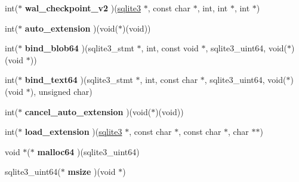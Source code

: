 \begin{DoxyCompactItemize}
\item 
int($\ast$ {\bfseries wal\+\_\+checkpoint\+\_\+v2} )(\hyperlink{structsqlite3}{sqlite3} $\ast$, const char $\ast$, int, int $\ast$, int $\ast$)\hypertarget{structsqlite3__api__routines_aff09d36bf959eb60923935f855b7f7b4}{}\label{structsqlite3__api__routines_aff09d36bf959eb60923935f855b7f7b4}

\item 
int($\ast$ {\bfseries auto\+\_\+extension} )(void($\ast$)(void))\hypertarget{structsqlite3__api__routines_afd7c008f165176aeeea8d6e4e0bfabc0}{}\label{structsqlite3__api__routines_afd7c008f165176aeeea8d6e4e0bfabc0}

\item 
int($\ast$ {\bfseries bind\+\_\+blob64} )(sqlite3\+\_\+stmt $\ast$, int, const void $\ast$, sqlite3\+\_\+uint64, void($\ast$)(void $\ast$))\hypertarget{structsqlite3__api__routines_af7cf21f7a1465dd0c4d6947762998aa2}{}\label{structsqlite3__api__routines_af7cf21f7a1465dd0c4d6947762998aa2}

\item 
int($\ast$ {\bfseries bind\+\_\+text64} )(sqlite3\+\_\+stmt $\ast$, int, const char $\ast$, sqlite3\+\_\+uint64, void($\ast$)(void $\ast$), unsigned char)\hypertarget{structsqlite3__api__routines_aafda4305000f885aabf0fe18bd86b905}{}\label{structsqlite3__api__routines_aafda4305000f885aabf0fe18bd86b905}

\item 
int($\ast$ {\bfseries cancel\+\_\+auto\+\_\+extension} )(void($\ast$)(void))\hypertarget{structsqlite3__api__routines_a33a813156c2973e7b41f4e1d01ec93da}{}\label{structsqlite3__api__routines_a33a813156c2973e7b41f4e1d01ec93da}

\item 
int($\ast$ {\bfseries load\+\_\+extension} )(\hyperlink{structsqlite3}{sqlite3} $\ast$, const char $\ast$, const char $\ast$, char $\ast$$\ast$)\hypertarget{structsqlite3__api__routines_a88b361b72306cad840dedefeb19edc43}{}\label{structsqlite3__api__routines_a88b361b72306cad840dedefeb19edc43}

\item 
void $\ast$($\ast$ {\bfseries malloc64} )(sqlite3\+\_\+uint64)\hypertarget{structsqlite3__api__routines_a1a4bbc2fc097764d5860930b7d812213}{}\label{structsqlite3__api__routines_a1a4bbc2fc097764d5860930b7d812213}

\item 
sqlite3\+\_\+uint64($\ast$ {\bfseries msize} )(void $\ast$)\hypertarget{structsqlite3__api__routines_a5d3a2ab51526f5ca02c97f9227abbcf3}{}\label{structsqlite3__api__routines_a5d3a2ab51526f5ca02c97f9227abbcf3}


\end{DoxyCompactItemize}
